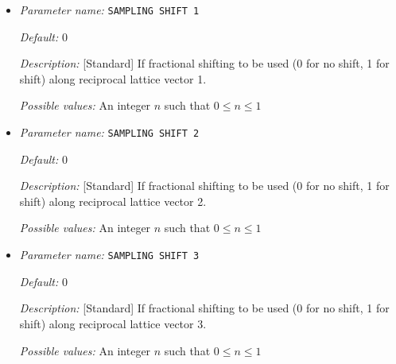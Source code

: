 \begin{itemize}


{\it Default:} 1


{\it Description:} [Standard] Number of Monkhorst-Pack grid points to be used along reciprocal lattice vector 3.


{\it Possible values:} An integer $n$ such that $1\leq n \leq 1000$
\item {\it Parameter name:} {\tt SAMPLING SHIFT 1}
\label{parameters:Brillouin zone k point sampling options/Monkhorst_2dPack _28MP_29 grid generation/SAMPLING SHIFT 1}
\label{parameters:Brillouin_20zone_20k_20point_20sampling_20options/Monkhorst_2dPack_20_28MP_29_20grid_20generation/SAMPLING_20SHIFT_201}




{\it Default:} 0


{\it Description:} [Standard] If fractional shifting to be used (0 for no shift, 1 for shift) along reciprocal lattice vector 1.


{\it Possible values:} An integer $n$ such that $0\leq n \leq 1$
\item {\it Parameter name:} {\tt SAMPLING SHIFT 2}
\label{parameters:Brillouin zone k point sampling options/Monkhorst_2dPack _28MP_29 grid generation/SAMPLING SHIFT 2}
\label{parameters:Brillouin_20zone_20k_20point_20sampling_20options/Monkhorst_2dPack_20_28MP_29_20grid_20generation/SAMPLING_20SHIFT_202}




{\it Default:} 0


{\it Description:} [Standard] If fractional shifting to be used (0 for no shift, 1 for shift) along reciprocal lattice vector 2.


{\it Possible values:} An integer $n$ such that $0\leq n \leq 1$
\item {\it Parameter name:} {\tt SAMPLING SHIFT 3}
\label{parameters:Brillouin zone k point sampling options/Monkhorst_2dPack _28MP_29 grid generation/SAMPLING SHIFT 3}
\label{parameters:Brillouin_20zone_20k_20point_20sampling_20options/Monkhorst_2dPack_20_28MP_29_20grid_20generation/SAMPLING_20SHIFT_203}




{\it Default:} 0


{\it Description:} [Standard] If fractional shifting to be used (0 for no shift, 1 for shift) along reciprocal lattice vector 3.


{\it Possible values:} An integer $n$ such that $0\leq n \leq 1$
\end{itemize}

